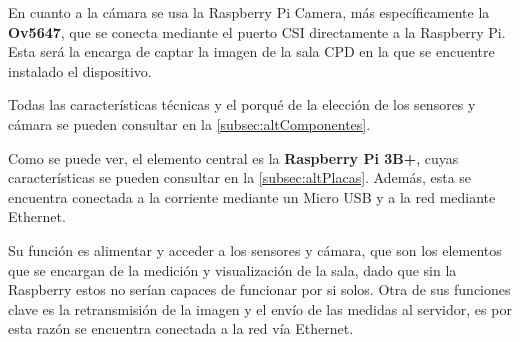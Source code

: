 En cuanto a la cámara se usa la Raspberry Pi Camera, más específicamente la \textbf{Ov5647}, que se conecta mediante el puerto CSI directamente a la Raspberry Pi. Esta será la encarga de captar la imagen de la sala CPD en la que se encuentre instalado el dispositivo.

Todas las características técnicas y el porqué de la elección de los sensores y cámara se pueden consultar en la \autoref{subsec:altComponentes}.

Como se puede ver, el elemento central es la \textbf{Raspberry Pi 3B+}, cuyas características se pueden consultar en la \autoref{subsec:altPlacas}. Además, esta se encuentra conectada a la corriente mediante un Micro USB y a la red mediante Ethernet.

Su función es alimentar y acceder a los sensores y cámara, que son los elementos que se encargan de la medición y visualización de la sala, dado que sin la Raspberry estos no serían capaces de funcionar por si solos. Otra de sus funciones clave es la retransmisión de la imagen y el envío de las medidas al servidor, es por esta razón se encuentra conectada a la red vía Ethernet.